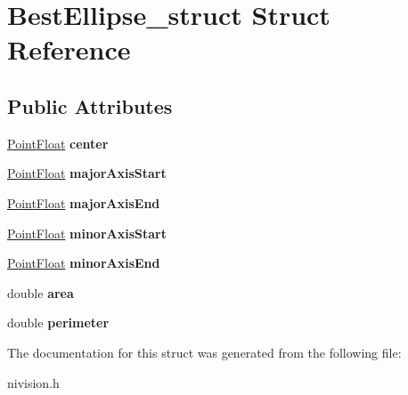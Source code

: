 \hypertarget{structBestEllipse__struct}{\section{\-Best\-Ellipse\-\_\-struct \-Struct \-Reference}
\label{structBestEllipse__struct}
}
\subsection*{\-Public \-Attributes}
\begin{DoxyCompactItemize}
\item 
\hypertarget{structBestEllipse__struct_a03e3166d6df99a4c69e41e926fb64aad}{\hyperlink{structPointFloat__struct}{\-Point\-Float} {\bfseries center}}\label{structBestEllipse__struct_a03e3166d6df99a4c69e41e926fb64aad}

\item 
\hypertarget{structBestEllipse__struct_af9b280fedff09f6c9353c14fce91c4e2}{\hyperlink{structPointFloat__struct}{\-Point\-Float} {\bfseries major\-Axis\-Start}}\label{structBestEllipse__struct_af9b280fedff09f6c9353c14fce91c4e2}

\item 
\hypertarget{structBestEllipse__struct_ac3d7216961e264d9321da9fd1ea683ec}{\hyperlink{structPointFloat__struct}{\-Point\-Float} {\bfseries major\-Axis\-End}}\label{structBestEllipse__struct_ac3d7216961e264d9321da9fd1ea683ec}

\item 
\hypertarget{structBestEllipse__struct_a7cd0eca9d3f812233ca132cfbcb58eb9}{\hyperlink{structPointFloat__struct}{\-Point\-Float} {\bfseries minor\-Axis\-Start}}\label{structBestEllipse__struct_a7cd0eca9d3f812233ca132cfbcb58eb9}

\item 
\hypertarget{structBestEllipse__struct_a323affeb5ac34894927e3e0d86f4ada8}{\hyperlink{structPointFloat__struct}{\-Point\-Float} {\bfseries minor\-Axis\-End}}\label{structBestEllipse__struct_a323affeb5ac34894927e3e0d86f4ada8}

\item 
\hypertarget{structBestEllipse__struct_a58fcc35d1b8e23ccd5adeb35862397e6}{double {\bfseries area}}\label{structBestEllipse__struct_a58fcc35d1b8e23ccd5adeb35862397e6}

\item 
\hypertarget{structBestEllipse__struct_a8a0fbcca637f15b8a8abd4e867503073}{double {\bfseries perimeter}}\label{structBestEllipse__struct_a8a0fbcca637f15b8a8abd4e867503073}

\end{DoxyCompactItemize}


\-The documentation for this struct was generated from the following file\-:\begin{DoxyCompactItemize}
\item 
nivision.\-h\end{DoxyCompactItemize}

